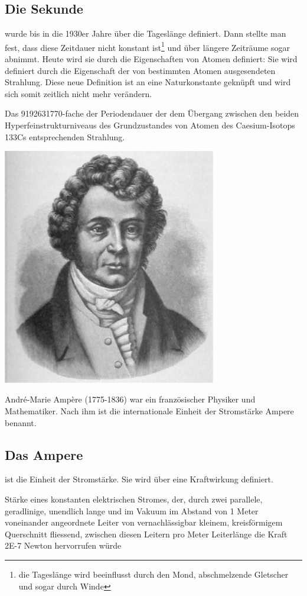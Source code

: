 \subsection{Die Sekunde} wurde bis in die 1930er Jahre über die Tageslänge definiert. Dann stellte man fest, dass diese Zeitdauer nicht konstant ist\footnote{die Tageslänge wird beeinflusst durch den Mond, abschmelzende Gletscher und sogar durch Winde} und über längere Zeiträume sogar abnimmt. Heute wird sie durch die Eigenschaften von Atomen definiert: Sie wird definiert durch die Eigenschaft der von bestimmten Atomen ausgesendeten Strahlung. Diese neue Definition ist an eine Naturkonstante geknüpft und wird sich somit zeitlich nicht mehr verändern.
\begin{definition}
Das \SI{9192631770}{}-fache der Periodendauer der dem Übergang zwischen den beiden Hyperfeinstrukturniveaus des Grundzustandes von Atomen des Caesium-Isotops 133Cs entsprechenden Strahlung.
\end{definition}
\begin{marginfigure}
    \includegraphics[width=0.7\textwidth]{Bilder/ampere.jpg}
    \label{fig:amperefig}
    \caption{André-Marie Ampère (1775-1836) war ein französischer Physiker und Mathematiker. Nach ihm ist die internationale Einheit der Stromstärke Ampere benannt.}
\end{marginfigure}
\subsection{Das Ampere}
ist die Einheit der Stromstärke. Sie wird über eine Kraftwirkung definiert.
\begin{definition}
Stärke eines konstanten elektrischen Stromes, der, durch zwei parallele, geradlinige, unendlich lange und im Vakuum im Abstand von 1 Meter voneinander angeordnete Leiter von vernachlässigbar kleinem, kreisförmigem Querschnitt fliessend, zwischen diesen Leitern pro Meter Leiterlänge die Kraft \SI{2E-7}{} Newton hervorrufen würde
\end{definition}

